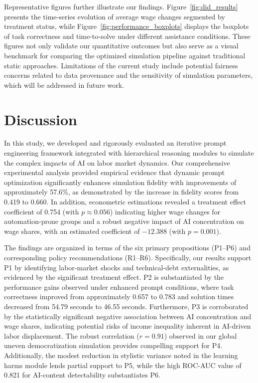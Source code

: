\documentclass{article}
\begin{document}
Representative figures further illustrate our findings. Figure~\ref{fig:did_results} presents the time-series evolution of average wage changes segmented by treatment status, while Figure~\ref{fig:performance_boxplots} displays the boxplots of task correctness and time-to-solve under different assistance conditions. These figures not only validate our quantitative outcomes but also serve as a visual benchmark for comparing the optimized simulation pipeline against traditional static approaches. Limitations of the current study include potential fairness concerns related to data provenance and the sensitivity of simulation parameters, which will be addressed in future work.

\section{Discussion}
In this study, we developed and rigorously evaluated an iterative prompt engineering framework integrated with hierarchical reasoning modules to simulate the complex impacts of AI on labor market dynamics. Our comprehensive experimental analysis provided empirical evidence that dynamic prompt optimization significantly enhances simulation fidelity with improvements of approximately 57.6\%, as demonstrated by the increase in fidelity scores from 0.419 to 0.660. In addition, econometric estimations revealed a treatment effect coefficient of 0.754 (with $p\approx0.056$) indicating higher wage changes for automation-prone groups and a robust negative impact of AI concentration on wage shares, with an estimated coefficient of $-12.388$ (with $p=0.001$).

The findings are organized in terms of the six primary propositions (P1–P6) and corresponding policy recommendations (R1–R6). Specifically, our results support P1 by identifying labor-market shocks and technical-debt externalities, as evidenced by the significant treatment effect. P2 is substantiated by the performance gains observed under enhanced prompt conditions, where task correctness improved from approximately 0.657 to 0.783 and solution times decreased from 54.79 seconds to 46.55 seconds. Furthermore, P3 is corroborated by the statistically significant negative association between AI concentration and wage shares, indicating potential risks of income inequality inherent in AI-driven labor displacement. The robust correlation ($r=0.91$) observed in our global uneven democratization simulation provides compelling support for P4. Additionally, the modest reduction in stylistic variance noted in the learning harms module lends partial support to P5, while the high ROC-AUC value of 0.821 for AI-content detectability substantiates P6.
\end{document}
